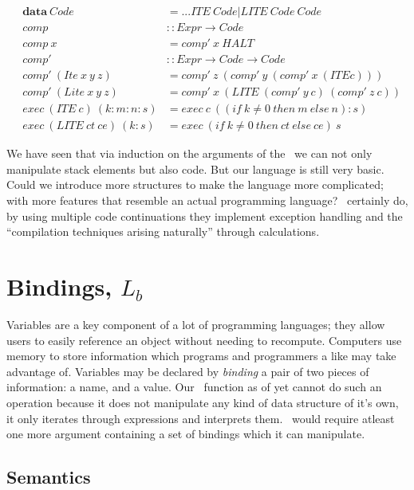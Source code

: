 \documentclass {article}
\begin{document}
\begin{eqnarray*}
	&\textbf{data}\ Code &= ...ITE\ Code | LITE\ Code\ Code \\
	&comp 				  &:: Expr \rightarrow Code \\
	&comp\ x			  &= comp'\ x\ HALT \\
	&comp'				  &:: Expr \rightarrow Code \rightarrow Code \\
	&comp'\ (Ite\ x\ y\ z) 
				&= comp'\ z\ (comp'\ y\ (comp'\ x\ (ITE c))) \\
	&comp'\ (Lite\ x\ y\ z) 
				&= comp'\ x\ (LITE\ (comp'\ y\ c)\ (comp'\ z\ c)) \\
	&exec\ (ITE\ c)\ (k:m:n:s) 
						&= exec\ c\ ((if\ k \not=0\ then\ m\ else\ n):s) \\
	&exec\ (LITE\ ct\ ce)\ (k:s) 
						&= exec\ (if\ k \not=0\ then\ ct\ else\ ce)\ s
\end{eqnarray*}

We have seen that via 
induction on the arguments of the 
\vm\ we can not only manipulate
stack elements but also code.
But our language is still very
basic.
Could we introduce more structures
to make the language more complicated;
with more features that resemble
an actual programming language?
\BH\ certainly do, by using 
multiple code continuations they
implement exception handling and the
``compilation techniques arising naturally''
through calculations\cite[page 24]{bandh}.

\section{Bindings, $L_b$}

Variables are a key component
of a lot of programming languages;
they allow users to easily reference
an object without needing to recompute.
Computers use memory to store information
which programs and programmers a like may
take advantage of.
Variables may be declared by \emph{binding}
a pair of two pieces of information:
a name, and a value.
Our \eval\ function as of yet 
cannot do such an operation
because it does not manipulate any kind of
data structure of it's own,
it only iterates through
expressions and interprets them.
\eval\ would require atleast one more argument
containing a set of bindings which it can
manipulate.

\subsection{Semantics}
\end{document}
